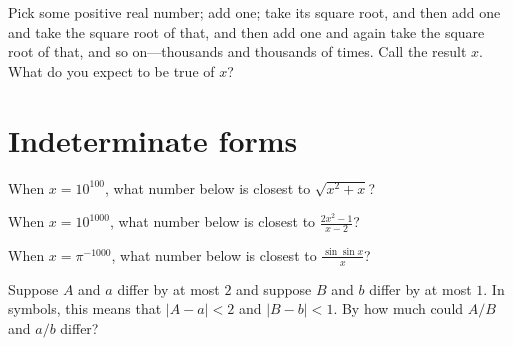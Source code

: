 \documentclass{ximera}
\begin{document}
\begin{problem}
  Pick some positive real number; add one; take its square root, and
  then add one and take the square root of that, and then add one and
  again take the square root of that, and so on---thousands and
  thousands of times.  Call the result $x$.  What do you expect to be
  true of $x$?
  \begin{multipleChoice}
  \end{multipleChoice}
\end{problem}

\clearpage

\section{Indeterminate forms}

\begin{problem}
  When $x = 10^{100}$, what number below is closest to $\sqrt{x^2 + x}$?
  \begin{multipleChoice}
  \end{multipleChoice}
\end{problem}

\begin{problem}
  When $x = 10^{1000}$, what number below is closest to $\frac{2x^2 - 1}{x-2}$? %
  \begin{multipleChoice}
  \end{multipleChoice}
\end{problem}

\begin{problem}
  When $x = \pi^{-1000}$, what number below is closest to $\frac{\sin \sin x}{x}$?
  \begin{multipleChoice}
  \end{multipleChoice}
\end{problem}

\begin{problem}
  Suppose $A$ and $a$ differ by at most $2$ and suppose $B$ and $b$
  differ by at most $1$.  In symbols, this means that $|A - a| < 2$ and $|B - b| < 1$.
  By how much could $A/B$ and $a/b$ differ?
  \begin{multipleChoice}
  \end{multipleChoice}
\end{problem}
\end{document}
